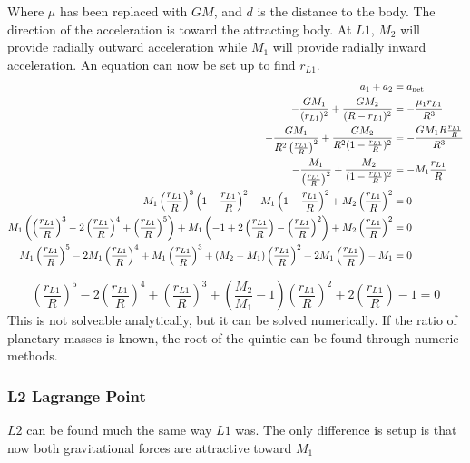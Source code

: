 \documentclass[../basicOrbitalDynamics.tex]{subfiles}
\begin{document}
Where $\mu$ has been replaced with $GM$, and $d$ is the distance to the body. The direction of the acceleration is toward the attracting body. At $L1$, $M_2$ will provide radially outward acceleration while $M_1$ will provide radially inward acceleration. An equation can now be set up to find $r_{L1}$.
\begin{align*}
    a_1+a_2   & ={a}_\text{net} \\
    -\frac{GM_1}{(r_{L1})^2}+\frac{GM_2}{(R-r_{L1})^2}& = -\frac{\mu_1 r_{L1}}{R^3} \\
    -\frac{GM_1}{R^2\left(\frac{r_{L1}}{R}\right)^2}+\frac{GM_2}{R^2(1-\frac{r_{L1}}{R})^2}   & = -\frac{GM_1 R\frac{r_{L1}}{R}}{R^3} \\
    -\frac{M_1}{\left(\frac{r_{L1}}{R}\right)^2}+\frac{M_2}{(1-\frac{r_{L1}}{R})^2} & = -M_1\frac{r_{L1}}{R} \\
    M_1\left(\frac{r_{L1}}{R}\right)^3\left(1-\frac{r_{L1}}{R}\right)^2-M_1\left(1-\frac{r_{L1}}{R}\right)^2+M_2\left(\frac{r_{L1}}{R}\right)^2 & = 0\\
    M_1\left(\left(\frac{r_{L1}}{R}\right)^3-2\left(\frac{r_{L1}}{R}\right)^4+\left(\frac{r_{L1}}{R}\right)^5\right)+M_1\left(-1+2\left(\frac{r_{L1}}{R}\right)-\left(\frac{r_{L1}}{R}\right)^2\right)+M_2\left(\frac{r_{L1}}{R}\right)^2 & = 0\\
    M_1\left(\frac{r_{L1}}{R}\right)^5-2M_1\left(\frac{r_{L1}}{R}\right)^4+M_1\left(\frac{r_{L1}}{R}\right)^3+(M_2-M_1)\left(\frac{r_{L1}}{R}\right)^2+2M_1\left(\frac{r_{L1}}{R}\right)-M_1 & = 0\\
\end{align*}

\begin{equation}\label{L1 Equation}
    \left(\frac{r_{L1}}{R}\right)^5-2\left(\frac{r_{L1}}{R}\right)^4+\left(\frac{r_{L1}}{R}\right)^3+\left(\frac{M_2}{M_1}-1\right)\left(\frac{r_{L1}}{R}\right)^2+2\left(\frac{r_{L1}}{R}\right)-1= 0
\end{equation}
This is not solveable analytically, but it can be solved numerically. If the ratio of planetary masses is known, the root of the quintic can be found through numeric methods.

\subsubsection{L2 Lagrange Point}

$L2$ can be found much the same way $L1$ was. The only difference is setup is that now both gravitational forces are attractive toward $M_1$
\end{document}

